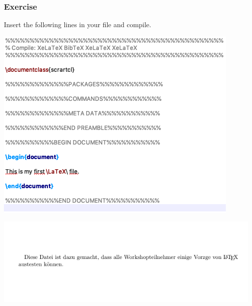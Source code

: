 \begin{frame}[fragile]
\frametitle{Exercise}

Insert the following lines in your  file and compile.

\vspace{.5cm}


\centering
\includegraphics[scale=0.45]{../../texfiles-beamer/tex-material/WissArb-latex/xelatexTest1tex}

%
%

\centering
\includegraphics[width=0.86\linewidth]{../../texfiles-beamer/tex-material/WissArb-latex/latexTest1pdf}



\end{frame}


